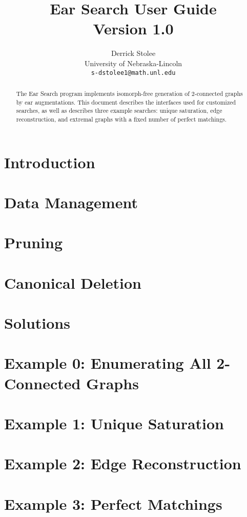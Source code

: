 \documentclass[11pt]{article}
\title{Ear Search User Guide\\ {\large Version 1.0}}
\author{Derrick Stolee \\ 
	University of Nebraska-Lincoln\\ 
	\texttt{s-dstolee1@math.unl.edu}
       }
\begin{document}
\maketitle
\vspace{-.3in}
\begin{abstract}
	The Ear Search program implements isomorph-free generation
		of 2-connected graphs by ear augmentations.
	This document describes the interfaces used for customized
		searches, as well as describes three example searches:
		unique saturation, edge reconstruction, and 
		extremal graphs with a fixed number of perfect matchings.
\end{abstract}

\section{Introduction}
\label{sec:Introduction}


\section{Data Management}



\section{Pruning}



\section{Canonical Deletion}




\section{Solutions}




\section{Example 0: Enumerating All 2-Connected Graphs}

\section{Example 1: Unique Saturation}


\section{Example 2: Edge Reconstruction}


\section{Example 3: Perfect Matchings}







\end{document}
